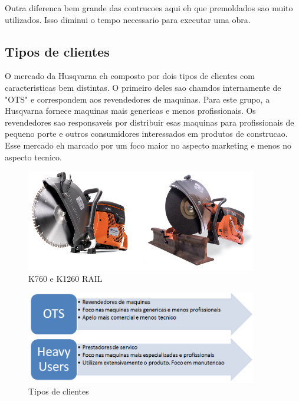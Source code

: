 \documentclass[12pt]{article}
\begin{document}
Outra diferenca bem grande das contrucoes aqui eh que premoldados sao muito utilizados. Isso diminui o tempo necessario para executar uma obra.

\subsection{Tipos de clientes}

	O mercado da Husqvarna eh composto por dois tipos de clientes com caracteristicas bem distintas. O primeiro deles sao chamdos internamente de "OTS" e correspondem aos revendedores de maquinas. Para este grupo, a Husqvarna fornece maquinas mais genericas e menos profissionais. Os revendedores sao responsaveis por distribuir esas maquinas para profissionais de pequeno porte e outros consumidores interessados em produtos de construcao. Esse mercado eh marcado por um foco maior no aspecto marketing e menos no aspecto tecnico.

\begin{figure}[h!]
	\centering
	\includegraphics[width=0.9\textwidth]{img/k760-vs-k1260rail.png}
	\caption{K760 e K1260 RAIL}
	\label{fig:k700vsk1260}
\end{figure}

\begin{figure}[h!]
	\centering
	\includegraphics[width=0.9\textwidth]{img/clientes.png}
	\caption{Tipos de clientes}
	\label{fig:tipo-clientes}
\end{figure}
\end{document}
